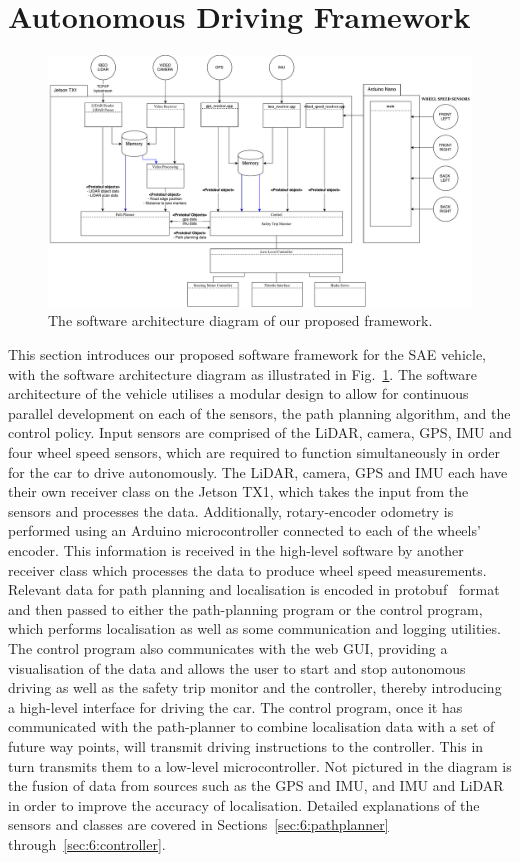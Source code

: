 \section{Autonomous Driving Framework}\label{sec:6:autonomous}
\begin{figure}
	\centering
	\includegraphics[width=\linewidth] {arch}
	\caption{The software architecture diagram of our proposed framework.}
	\label{fig:6:arch}
\end{figure}

This section introduces our proposed software framework for the SAE vehicle, with the software architecture diagram as illustrated in Fig.~\ref{fig:6:arch}. The software architecture of the vehicle utilises a modular design to allow for continuous parallel development on each of the sensors, the path planning algorithm, and the control policy. Input sensors are comprised of the LiDAR, camera, GPS, IMU and four wheel speed sensors, which are required to function simultaneously in order for the car to drive autonomously. The LiDAR, camera, GPS and IMU each have their own receiver class on the Jetson TX1, which takes the input from the sensors and processes the data. Additionally, rotary-encoder odometry is performed using an Arduino microcontroller connected to each of the wheels' encoder. This information is received in the high-level software by another receiver class which processes the data to produce wheel speed measurements. Relevant data for path planning and localisation is encoded in protobuf~\cite{google_developers_protocol_nodate} format and then passed to either the path-planning program or the control program, which performs localisation as well as some communication and logging utilities. The control program also communicates with the web GUI, providing a visualisation of the data and allows the user to start and stop autonomous driving as well as the safety trip monitor and the controller, thereby introducing a high-level interface for driving the car. The control program, once it has communicated with the path-planner to combine localisation data with a set of future way points, will transmit driving instructions to the controller. This in turn transmits them to a low-level microcontroller. Not pictured in the diagram is the fusion of data from sources such as the GPS and IMU, and IMU and LiDAR in order to improve the accuracy of localisation. Detailed explanations of the sensors and classes are covered in Sections~\ref{sec:6:pathplanner} through~\ref{sec:6:controller}.

